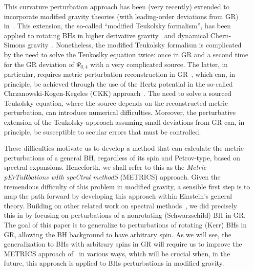 \documentclass[aps,prx,amsmath,floats,floatfix,twocolumn,
  superscriptaddress,nofootinbib,showpacs]{revtex4-1}
\begin{document}
This curvature perturbation approach has been (very recently) extended to incorporate modified gravity theories (with leading-order deviations from GR) in~\cite{Li:2022pcy,Hussain:2022ins}. 
This extension, the so-called ``modified Teukolsky formalism'', has been applied to rotating BHs in higher derivative gravity~\cite{Cano:2023jbk, Cano:2020cao, Cano:2021myl, Cano:2023tmv} and dynamical Chern-Simons gravity~\cite{Wagle:dcsslow}. 
Nonetheless, the modified Teukolsky formalism is complicated by the need to solve the Teukoslky equation twice: once in GR and a second time for the GR deviation of $\Psi_{0,4}$ with a very complicated source. 
The latter, in particular, requires metric perturbation reconstruction in GR~\cite{Li:2022pcy}, which can, in principle, be achieved through the use of the Hertz potential in the so-called Chrzanowski-Kogen-Kegeles (CKK) approach~\cite{Chrzanowski:1975wv, Toomani:2021jlo, Whiting_Price_2005, Lousto:2005xu, Ripley:2020xby, Ripley:2022ypi}. 
The need to solve a sourced Teukolsky equation, where the source depends on the reconstructed metric perturbation, can introduce numerical difficulties. 
Moreover, the perturbative extension of the Teukolsky approach assuming small deviations from GR can, in principle, be susceptible to secular errors that must be controlled. 

These difficulties motivate us to develop a method that can calculate the metric perturbations of a general BH, regardless of its spin and Petrov-type, based on spectral expansions. Henceforth, we shall refer to this as the \textit{Metric pErTuRbations wIth speCtral methodS} (METRICS) approach. 
Given the tremendous difficulty of this problem in modified gravity, a sensible first step is to map the path forward by developing this approach within Einstein's general theory. 
Building on other related work on spectral methods~\cite{Jansen:2017oag, Eperon:2019viw, Dias:2018ufh, Ripley:2022ypi, Cardoso:2013pza, Ripley:2020xby, Dias:2015wqa, Dias:2021yju, Dias:2022oqm, Jansen:2017oag, Langlois:2021aji, Langlois:2021xzq, Dias:2014eua, Dias:2014eua, Spectral_03, Spectral_04, Spectral_05, Santos:2015iua}, we did precisely this in \cite{Chung:2023zdq} by focusing on perturbations of a nonrotating (Schwarzschild) BH in GR.
The goal of this paper is to generalize \cite{Chung:2023zdq} to perturbations of rotating (Kerr) BHs in GR, allowing the BH background to have arbitrary spin. As we will see, the generalization to BHs with arbitrary spins in GR will require us to improve the METRICS approach of~\cite{Chung:2023zdq} in various ways, which will be crucial when, in the future, this approach is applied to BHs perturbations in modified gravity. 
\end{document}
